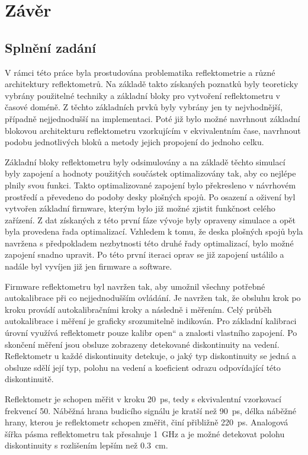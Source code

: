 \chapter{Závěr}

\section{Splnění zadání}
V rámci této práce byla prostudována problematika reflektometrie a různé architektury reflektometrů. Na základě takto získaných poznatků byly teoreticky vybrány použitelné techniky a základní bloky pro vytvoření reflektometru v časové doméně. Z těchto základních prvků byly vybrány jen ty nejvhodnější, případně nejjednodušší na implementaci. Poté již bylo možné navrhnout základní blokovou architekturu reflektometru vzorkujícím v ekvivalentním čase, navrhnout podobu jednotlivých bloků a metody jejich propojení do jednoho celku. 

Základní bloky reflektometru byly odsimulovány a na základě těchto simulací byly zapojení a hodnoty použitých součástek optimalizovány tak, aby co nejlépe plnily svou funkci. Takto optimalizované zapojení bylo překresleno v návrhovém prostředí a převedeno do podoby desky plošných spojů. Po osazení a oživení byl vytvořen základní firmware, kterým bylo již možné zjistit funkčnost celého zařízení. Z dat získaných z této první fáze vývoje byly opraveny simulace a opět byla provedena řada optimalizací. Vzhledem k tomu, že deska plošných spojů byla navržena s předpokladem nezbytnosti této druhé řady optimalizací, bylo možné zapojení snadno upravit. Po této první iteraci oprav se již zapojení ustálilo a nadále byl vyvíjen již jen firmware a software.

Firmware reflektometru byl navržen tak, aby umožnil všechny potřebné autokalibrace při co nejjednodušším ovládání. Je navržen tak, že obsluhu krok po kroku provádí autokalibračními kroky a následně i měřením. Celý průběh autokalibrace i měření je graficky srozumitelně indikován. Pro základní kalibraci úrovní využívá reflektometr pouze kalibr \quotedblbase open\textquotedblleft{} a znalosti vlastního zapojení. Po skončení měření jsou obsluze zobrazeny detekované diskontinuity na vedení. Reflektometr u každé diskontinuity detekuje, o jaký typ diskontinuity se jedná a obsluze sdělí její typ, polohu na vedení a koeficient odrazu odpovídající této diskontinuitě.

Reflektometr je schopen měřit v kroku \SI{20}{\pico\second}, tedy s ekvivalentní vzorkovací frekvencí \SI{50}{\gigasample}. Náběžná hrana budicího signálu je kratší než \SI{90}{\pico\second}, délka náběžné hrany, kterou je reflektometr schopen změřit, činí přibližně \SI{220}{\pico\second}. Analogová šířka pásma reflektometru tak přesahuje \SI{1}{\giga\hertz} a je možné detekovat polohu diskontinuity s rozlišením lepším než \SI{0.3}{\centi\meter}.

